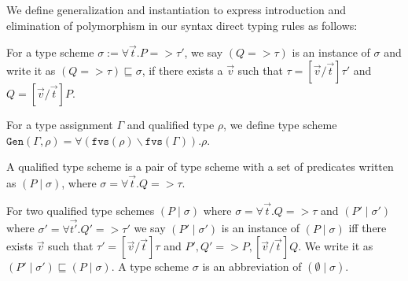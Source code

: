 We define generalization and instantiation to express introduction and elimination of polymorphism in our
syntax direct typing rules as follows:
\begin{defn}[Instantiation]
  For a type scheme $\sigma := \forall \vec{t}. P => \tau'$, we say $(Q => \tau)$ is
  an instance of $\sigma$ and write it as $(Q => \tau) \sqsubseteq \sigma$, if there exists a $\vec{v}$
  such that $\tau = [\vec{v} / \vec{t}] \tau'$ and $Q = [\vec{v} / \vec{t}]P$.
\end{defn}

\begin{defn}[Generalization]
  For a type assignment $\Gamma$ and qualified type $\rho$, we define type scheme
  $\texttt{Gen}(\Gamma, \rho) = \forall (\texttt{fvs}(\rho) \backslash \texttt{fvs}(\Gamma)). \rho$.
\end{defn}

\begin{defn}
  A qualified type scheme is a pair of type scheme with a set of predicates written as $(P \mid \sigma)$,
  where $\sigma = \forall \vec{t}. Q => \tau$.
\end{defn}
\begin{defn}
  For two qualified type schemes $(P \mid \sigma)$ where $\sigma = \forall \vec{t}. Q => \tau$ and
  $(P' \mid \sigma')$ where $\sigma' = \forall \vec{t'}. Q' => \tau'$ we say $(P' \mid \sigma')$ is an
  instance of $(P \mid \sigma)$ iff there exists $\vec{v}$ such that $\tau' = [\vec{v}/ \vec{t}]\tau$ and
  $P',Q' => P, [\vec{v}/ \vec{t}]Q$. We write it as $(P' \mid \sigma') \sqsubseteq (P \mid \sigma)$. A type scheme
  $\sigma$ is an abbreviation of $(\emptyset \mid \sigma)$.
\end{defn}

